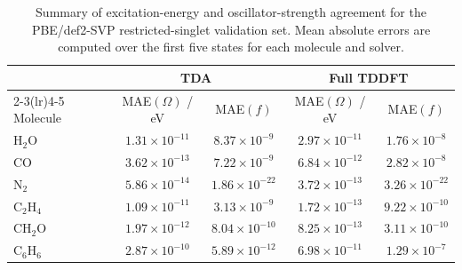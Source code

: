 \begin{table}[t]
\centering
\caption{Summary of excitation-energy and oscillator-strength agreement for the PBE/def2-SVP restricted-singlet validation set. Mean absolute errors are computed over the first five states for each molecule and solver.}
\label{tab:ad-kernel-excitation-oscillator}
\begin{tabular}{lcccc}
\toprule
& \multicolumn{2}{c}{TDA} & \multicolumn{2}{c}{Full TDDFT} \\
\cmidrule(lr){2-3}\cmidrule(lr){4-5}
Molecule & MAE$(\Omega)$ / eV & MAE$(f)$ & MAE$(\Omega)$ / eV & MAE$(f)$ \\
\midrule
H$_2$O & $1.31\times 10^{-11}$ & $8.37\times 10^{-9}$ & $2.97\times 10^{-11}$ & $1.76\times 10^{-8}$ \\
CO & $3.62\times 10^{-13}$ & $7.22\times 10^{-9}$ & $6.84\times 10^{-12}$ & $2.82\times 10^{-8}$ \\
N$_2$ & $5.86\times 10^{-14}$ & $1.86\times 10^{-22}$ & $3.72\times 10^{-13}$ & $3.26\times 10^{-22}$ \\
C$_2$H$_4$ & $1.09\times 10^{-11}$ & $3.13\times 10^{-9}$ & $1.72\times 10^{-13}$ & $9.22\times 10^{-10}$ \\
CH$_2$O & $1.97\times 10^{-12}$ & $8.04\times 10^{-10}$ & $8.25\times 10^{-13}$ & $3.11\times 10^{-10}$ \\
C$_6$H$_6$ & $2.87\times 10^{-10}$ & $5.89\times 10^{-12}$ & $6.98\times 10^{-11}$ & $1.29\times 10^{-7}$ \\
\bottomrule
\end{tabular}
\end{table}
